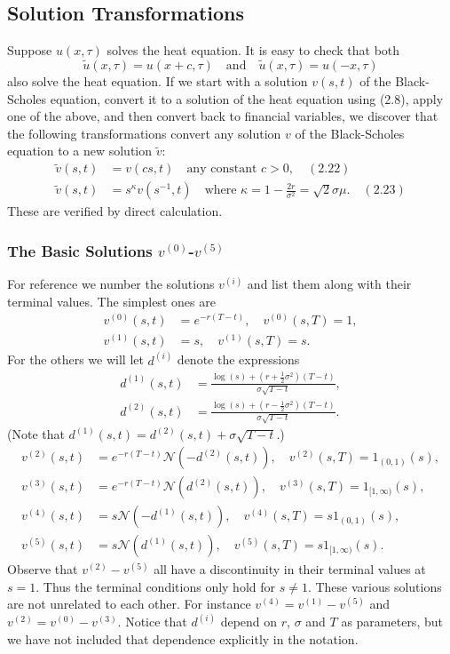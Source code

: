 \subsection{Solution Transformations}

Suppose \(u(x,\tau)\) solves the heat equation. It is easy to check that both
\[
\tilde{u}(x,\tau) = u(x + c, \tau) \quad \text{and} \quad \tilde{u}(x,\tau) = u(-x, \tau)
\]
also solve the heat equation. If we start with a solution \(v(s,t)\) of the Black-Scholes equation, convert it to a solution of the heat equation using (2.8), apply one of the above, and then convert back to financial variables, we discover that the following transformations convert any solution \(v\) of the Black-Scholes equation to a new solution \(\tilde{v}\):
\begin{align}
\tilde{v}(s,t) &= v(c s, t) \quad \text{any constant } c > 0, \quad(2.22) \\
\tilde{v}(s,t) &= s^{\kappa} v(s^{-1}, t) \quad \text{where } \kappa = 1 - \frac{2r}{\sigma^2} = \sqrt{2} \sigma \mu. \quad(2.23)
\end{align}
These are verified by direct calculation.

\subsubsection{The Basic Solutions \(v^{(0)}\)-\(v^{(5)}\)}

For reference we number the solutions \(v^{(i)}\) and list them along with their terminal values. The simplest ones are
\begin{align*}
v^{(0)}(s,t) &= e^{-r(T-t)}, \quad v^{(0)}(s,T) = 1, \\
v^{(1)}(s,t) &= s, \quad v^{(1)}(s,T) = s.
\end{align*}
For the others we will let \(d^{(i)}\) denote the expressions
\begin{align*}
d^{(1)}(s,t) &= \frac{\log(s) + (r + \frac{1}{2}\sigma^2)(T-t)}{\sigma \sqrt{T-t}}, \\
d^{(2)}(s,t) &= \frac{\log(s) + (r - \frac{1}{2}\sigma^2)(T-t)}{\sigma \sqrt{T-t}}.
\end{align*}
(Note that \(d^{(1)}(s,t) = d^{(2)}(s,t) + \sigma \sqrt{T-t}\).)
\begin{align*}
v^{(2)}(s,t) &= e^{-r(T-t)} \mathcal{N}(-d^{(2)}(s,t)), \quad v^{(2)}(s,T) = 1_{(0,1)}(s), \\
v^{(3)}(s,t) &= e^{-r(T-t)} \mathcal{N}(d^{(2)}(s,t)), \quad v^{(3)}(s,T) = 1_{[1,\infty)}(s), \\
v^{(4)}(s,t) &= s \mathcal{N}(-d^{(1)}(s,t)), \quad v^{(4)}(s,T) = s 1_{(0,1)}(s), \\
v^{(5)}(s,t) &= s \mathcal{N}(d^{(1)}(s,t)), \quad v^{(5)}(s,T) = s 1_{[1,\infty)}(s).
\end{align*}
Observe that \(v^{(2)} - v^{(5)}\) all have a discontinuity in their terminal values at \(s = 1\). Thus the terminal conditions only hold for \(s \neq 1\). These various solutions are not unrelated to each other. For instance \(v^{(4)} = v^{(1)} - v^{(5)}\) and \(v^{(2)} = v^{(0)} - v^{(3)}\). Notice that \(d^{(i)}\) depend on \(r\), \(\sigma\) and \(T\) as parameters, but we have not included that dependence explicitly in the notation.


